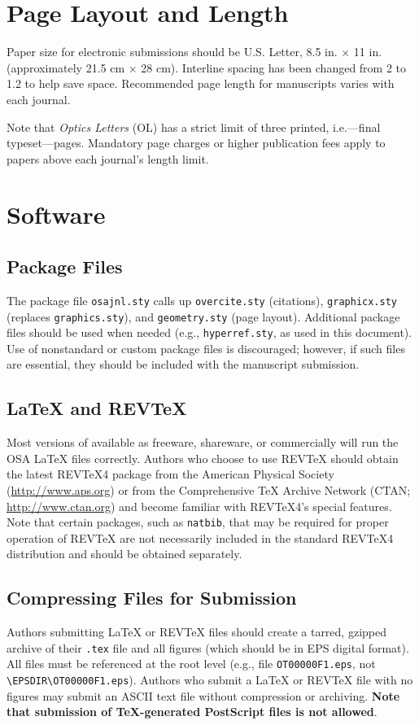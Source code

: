 \documentclass[letterpaper,11pt]{article}   %
\begin{document}
\section{Page Layout and Length}
Paper size for electronic submissions should be U.S. Letter, 8.5
in. $\times$ 11 in. (approximately 21.5 cm $\times$ 28 cm). 
Interline spacing has been changed from 2 to 1.2 to help save space. Recommended page length for manuscripts varies with each journal. 

Note that \textit{Optics Letters} (OL) has a strict limit of
three printed, i.e.---final typeset---pages. Mandatory page
charges or higher publication fees apply to papers above each
journal's length limit.
\section{Software}
\subsection{Package Files}
The package file \texttt{osajnl.sty} calls up
\texttt{overcite.sty} (citations), \texttt{graphicx.sty} (replaces \texttt{graphics.sty}), and \texttt{geometry.sty} (page layout). Additional
package files should be used when needed (e.g.,
\texttt{hyperref.sty}, as used in this document). Use of
nonstandard or custom package files is discouraged; however, if
such files are essential, they should be included with the
manuscript submission.

\subsection{\LaTeX{} and REV\TeX} Most versions of \LaTeXe{}
available as freeware, shareware, or commercially will run the OSA
\LaTeX{} files correctly. Authors who choose to use REV\TeX{}
should obtain the latest REV\TeX{}4 package from the American
Physical Society (\url{http://www.aps.org}) or from the
Comprehensive \TeX{} Archive Network (CTAN;
\href{http://www.ctan.org}{http://www.ctan.org}) and become familiar with REV\TeX{}4's
special features. Note that certain packages, such as
\verb+natbib+, that may be required for proper operation of
REV\TeX{} are not necessarily included in the standard REV\TeX{}4
distribution and should be obtained separately.

\subsection{Compressing Files for Submission}
Authors submitting \LaTeX{} or REV\TeX{} files should create a
tarred, gzipped archive of their \texttt{.tex} file and all
figures (which should be in EPS digital format). All files must be
referenced at the root level (e.g., file {\tt OT00000F1.eps}, not
\verb+\EPSDIR\OT00000F1.eps+).  Authors who submit a \LaTeX{} or REV\TeX{} file
with no figures may submit an ASCII text file without compression
or archiving. {\bf Note that submission of \TeX-generated
PostScript files is not allowed}.
\end{document}
